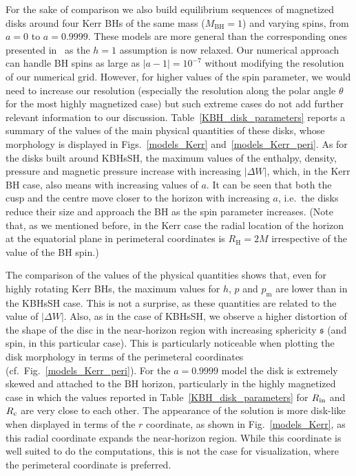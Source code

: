 \documentclass[twocolumn,aps,showpacs,showkeys,prd,superscriptaddress,byrevtex, amsmath]{revtex4-1}
\begin{document}
For the sake of comparison we also build equilibrium sequences of magnetized disks around four Kerr BHs of the same mass ($M_{\mathrm{BH}} = 1$) and varying spins, from $a=0$ to $a=0.9999$. These models are more general than the corresponding ones presented in~\cite{Gimeno-Soler:2017} as the $h=1$ assumption is now relaxed. Our numerical approach can handle BH spins as large as $|a-1|=10^{-7}$ without modifying the resolution of our numerical grid. However, for higher values of the spin parameter, we would need to increase our resolution (especially the resolution along the polar angle $\theta$ for the most highly magnetized case) but such extreme cases do not add further relevant information to our discussion. Table~\ref{KBH_disk_parameters} reports a summary of the values of the main physical quantities of these disks, whose morphology is displayed in Figs.~\ref{models_Kerr} and~\ref{models_Kerr_peri}. As for the disks built around KBHsSH, the maximum values of the enthalpy, density, pressure and magnetic pressure increase with increasing $|\Delta W|$, which, in the Kerr BH case, also means with increasing values of $a$. It can be seen that both the cusp and the centre move closer to the horizon with increasing $a$, i.e.~the disks reduce their size and approach the BH as the spin parameter increases. (Note that, as we mentioned before, in the Kerr case the radial location of the horizon at the equatorial plane in perimeteral coordinates is $R_{\mathrm{H}} = 2M$ irrespective of the value of the BH spin.) 

The comparison of the values of the physical quantities shows that, even for highly rotating Kerr BHs, the maximum values for $h$, $p$ and $p_{\mathrm{m}}$ are lower than in the KBHsSH case. This is not a surprise, as these quantities are related to the value of $|\Delta W|$. Also, as in the case of KBHsSH, we observe a higher distortion of the shape of the disc in the near-horizon region with increasing sphericity $\mathfrak{s}$ (and spin, in this particular case). This is particularly noticeable when plotting the disk morphology in terms of the perimeteral coordinates (cf.~Fig.~\ref{models_Kerr_peri}). For the $a=0.9999$ model the disk is extremely skewed and attached to the BH horizon, particularly in the highly magnetized case in which the values reported in Table~\ref{KBH_disk_parameters} for $R_{\rm in}$ and $R_{\rm c}$ are very close to each other. The appearance of the solution is more disk-like when displayed in terms of the $r$ coordinate, as shown in Fig.~\ref{models_Kerr}, as this radial coordinate expands the near-horizon region. While this coordinate is well suited to do the computations, this is not the case for visualization, where the perimeteral coordinate is preferred.  
\end{document}
